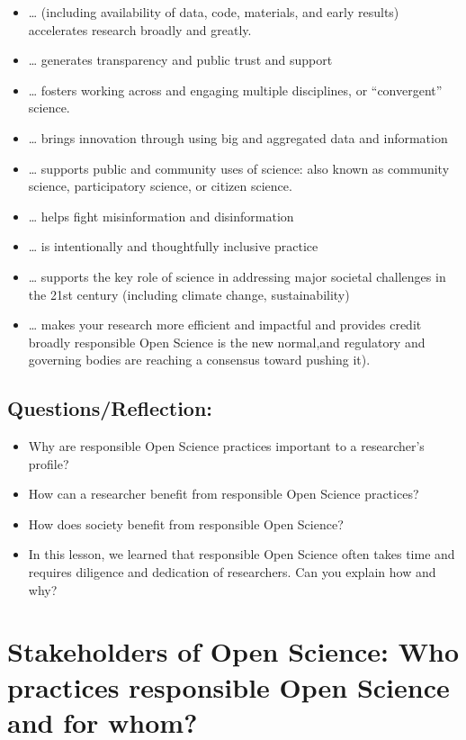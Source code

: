 \documentclass[
  letterpaper,
  DIV=11,
  numbers=noendperiod]{scrreport}
\providecommand{\tightlist}{%
  \setlength{\itemsep}{0pt}\setlength{\parskip}{0pt}}\usepackage{longtable,booktabs,array}
\begin{document}
\begin{itemize}
\tightlist
\item
  \ldots{} (including availability of data, code, materials, and early
  results) accelerates research broadly and greatly.
\item
  \ldots{} generates transparency and public trust and support
\item
  \ldots{} fosters working across and engaging multiple disciplines, or
  ``convergent'' science.
\item
  \ldots{} brings innovation through using big and aggregated data and
  information
\item
  \ldots{} supports public and community uses of science: also known as
  community science, participatory science, or citizen science.
\item
  \ldots{} helps fight misinformation and disinformation
\item
  \ldots{} is intentionally and thoughtfully inclusive practice
\item
  \ldots{} supports the key role of science in addressing major societal
  challenges in the 21st century (including climate change,
  sustainability)
\item
  \ldots{} makes your research more efficient and impactful and provides
  credit broadly responsible Open Science is the new normal,and
  regulatory and governing bodies are reaching a consensus toward
  pushing it).
\end{itemize}

\hypertarget{questionsreflection-1}{%
\section{Questions/Reflection:}\label{questionsreflection-1}}

\begin{itemize}
\tightlist
\item
  Why are responsible Open Science practices important to a researcher's
  profile?
\item
  How can a researcher benefit from responsible Open Science practices?
\item
  How does society benefit from responsible Open Science?
\item
  In this lesson, we learned that responsible Open Science often takes
  time and requires diligence and dedication of researchers. Can you
  explain how and why?
\end{itemize}

\hypertarget{stakeholders-of-open-science-who-practices-responsible-open-science-and-for-whom}{%
\chapter{Stakeholders of Open Science: Who practices responsible Open
Science and for
whom?}\label{stakeholders-of-open-science-who-practices-responsible-open-science-and-for-whom}}
\end{document}
